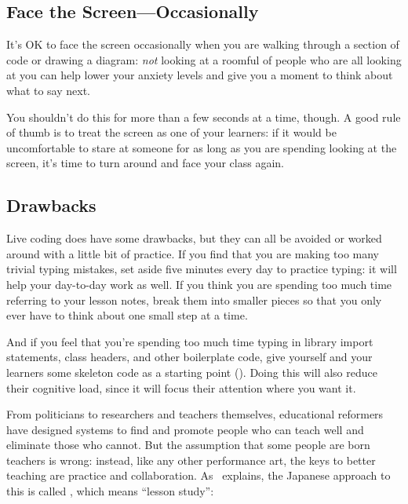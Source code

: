\subsection*{Face the Screen---Occasionally}

It's OK to face the screen occasionally
when you are walking through a section of code or drawing a diagram:
\emph{not} looking at a roomful of people who are all looking at you
can help lower your anxiety levels and give you a moment to think about what to say next.

You shouldn't do this for more than a few seconds at a time, though.
A good rule of thumb is to treat the screen as one of your learners:
if it would be uncomfortable to stare at someone
for as long as you are spending looking at the screen,
it's time to turn around and face your class again.

\subsection*{Drawbacks}

Live coding does have some drawbacks,
but they can all be avoided or worked around with a little bit of practice.
If you find that you are making too many trivial typing mistakes,
set aside five minutes every day to practice typing:
it will help your day-to-day work as well.
If you think you are spending too much time referring to your lesson notes,
break them into smaller pieces
so that you only ever have to think about one small step at a time.

And if you feel that you're spending too much time typing in library import statements,
class headers,
and other boilerplate code,
give yourself and your learners some skeleton code as a starting point ().
Doing this will also reduce their cognitive load,
since it will focus their attention where you want it.


From politicians to researchers and teachers themselves,
educational reformers have designed systems
to find and promote people who can teach well
and eliminate those who cannot.
But the assumption that some people are born teachers is wrong:
instead,
like any other performance art,
the keys to better teaching are practice and collaboration.
As~\cite{Gree2014} explains,
the Japanese approach to this is called ,
which means ``lesson study'':

